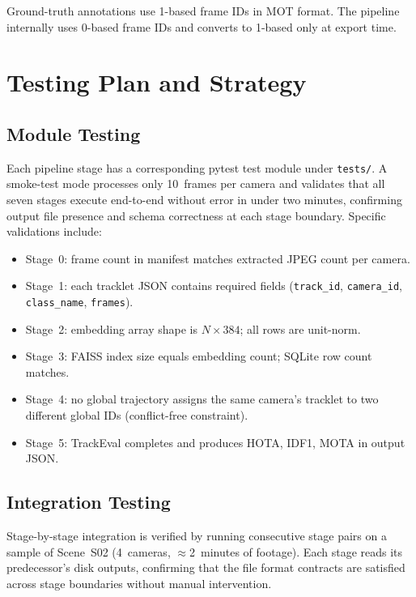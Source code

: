 Ground-truth annotations use 1-based frame IDs in MOT format. The pipeline internally uses 0-based frame IDs and converts to 1-based only at export time.

\section{Testing Plan and Strategy}

\subsection{Module Testing}

Each pipeline stage has a corresponding pytest test module under \texttt{tests/}. A smoke-test mode processes only 10~frames per camera and validates that all seven stages execute end-to-end without error in under two minutes, confirming output file presence and schema correctness at each stage boundary. Specific validations include:

\begin{itemize}
    \item Stage~0: frame count in manifest matches extracted JPEG count per camera.
    \item Stage~1: each tracklet JSON contains required fields (\texttt{track\_id}, \texttt{camera\_id}, \texttt{class\_name}, \texttt{frames}).
    \item Stage~2: embedding array shape is $N \times 384$; all rows are unit-norm.
    \item Stage~3: FAISS index size equals embedding count; SQLite row count matches.
    \item Stage~4: no global trajectory assigns the same camera's tracklet to two different global IDs (conflict-free constraint).
    \item Stage~5: TrackEval completes and produces HOTA, IDF1, MOTA in output JSON.
\end{itemize}

\subsection{Integration Testing}

Stage-by-stage integration is verified by running consecutive stage pairs on a sample of Scene~S02 (4~cameras, $\approx$2~minutes of footage). Each stage reads its predecessor's disk outputs, confirming that the file format contracts are satisfied across stage boundaries without manual intervention.

